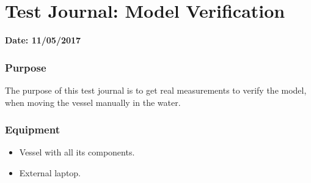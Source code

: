 \chapter{Test Journal: Model Verification}\label{app:modelVerification}

\textbf{Date: 11/05/2017}

\subsection*{Purpose}
The purpose of this test journal is to get real measurements to verify the model, when moving the vessel manually in the water.


\subsection*{Equipment}
\begin{itemize}
	\item Vessel with all its components.
	\item External laptop.
\end{itemize}

